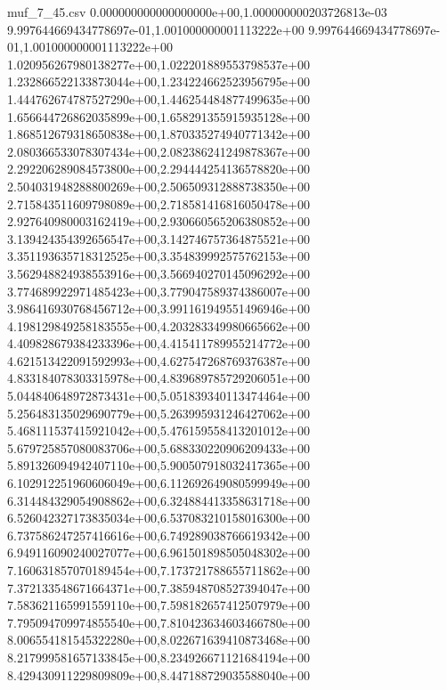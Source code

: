 
\begin{filecontents*}{muf_7_45.csv}
0.000000000000000000e+00,1.000000000203726813e-03
9.997644669434778697e-01,1.001000000001113222e+00
9.997644669434778697e-01,1.001000000001113222e+00
1.020956267980138277e+00,1.022201889553798537e+00
1.232866522133873044e+00,1.234224662523956795e+00
1.444762674787527290e+00,1.446254484877499635e+00
1.656644726862035899e+00,1.658291355915935128e+00
1.868512679318650838e+00,1.870335274940771342e+00
2.080366533078307434e+00,2.082386241249878367e+00
2.292206289084573800e+00,2.294444254136578820e+00
2.504031948288800269e+00,2.506509312888738350e+00
2.715843511609798089e+00,2.718581416816050478e+00
2.927640980003162419e+00,2.930660565206380852e+00
3.139424354392656547e+00,3.142746757364875521e+00
3.351193635718312525e+00,3.354839992575762153e+00
3.562948824938553916e+00,3.566940270145096292e+00
3.774689922971485423e+00,3.779047589374386007e+00
3.986416930768456712e+00,3.991161949551496946e+00
4.198129849258183555e+00,4.203283349980665662e+00
4.409828679384233396e+00,4.415411789955214772e+00
4.621513422091592993e+00,4.627547268769376387e+00
4.833184078303315978e+00,4.839689785729206051e+00
5.044840648972873431e+00,5.051839340113474464e+00
5.256483135029690779e+00,5.263995931246427062e+00
5.468111537415921042e+00,5.476159558413201012e+00
5.679725857080083706e+00,5.688330220906209433e+00
5.891326094942407110e+00,5.900507918032417365e+00
6.102912251960606049e+00,6.112692649080599949e+00
6.314484329054908862e+00,6.324884413358631718e+00
6.526042327173835034e+00,6.537083210158016300e+00
6.737586247257416616e+00,6.749289038766619342e+00
6.949116090240027077e+00,6.961501898505048302e+00
7.160631857070189454e+00,7.173721788655711862e+00
7.372133548671664371e+00,7.385948708527394047e+00
7.583621165991559110e+00,7.598182657412507979e+00
7.795094709974855540e+00,7.810423634603466780e+00
8.006554181545322280e+00,8.022671639410873468e+00
8.217999581657133845e+00,8.234926671121684194e+00
8.429430911229809809e+00,8.447188729035588040e+00

\end{filecontents*}

